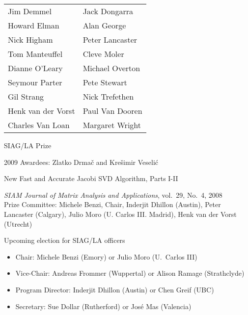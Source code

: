 \documentclass[]{seminar}
\begin{document}
{\begin{slide}
\centering
\begin{tabular}{ll}
Jim Demmel &
Jack Dongarra \\
Howard Elman &
Alan George \\
Nick Higham &
Peter Lancaster \\
Tom Manteuffel &
Cleve Moler \\
Dianne O'Leary &
Michael Overton\\
Seymour Parter &
Pete Stewart \\
Gil Strang &
Nick Trefethen \\
Henk van der Vorst &
Paul Van Dooren \\ 
Charles Van Loan
&
Margaret Wright
\end{tabular}

\end{slide}
\begin{slide}

\begin{center}
{\color{red}
SIAG/LA Prize
}
\end{center}



{\color{blue}
2009 Awardees:}
Zlatko Drma\v{c} and Kre\v{s}imir Veseli\'{c}

New Fast and Accurate Jacobi SVD Algorithm, Parts I-II

{\em SIAM Journal of Matrix Analysis and Applications},
vol.~29, No.~4, 2008
\\

{\color{blue}Prize Committee:} Michele Benzi, Chair,
Inderjit Dhillon (Austin), Peter Lancaster (Calgary), 
Julio Moro (U. Carlos III. Madrid),
Henk van der Vorst (Utrecht)

\end{slide}
\begin{slide}


\begin{center}
{\color{red}
Upcoming election for SIAG/LA officers
}
\end{center}

\begin{itemize}
\item {\color{blue} Chair:} 
Michele Benzi (Emory) or Julio Moro (U.\ Carlos III)
\item {\color{blue} Vice-Chair:} 
Andreas Frommer (Wuppertal) 
or
Alison Ramage (Strathclyde)
\item {\color{blue} Program Director:} 
Inderjit Dhillon (Austin) 
or Chen Greif (UBC)
\item {\color{blue} Secretary:} 
Sue Dollar (Rutherford)
or Jos\'e Mas (Valencia)
\end{itemize}


\end{slide}}
\end{document}
